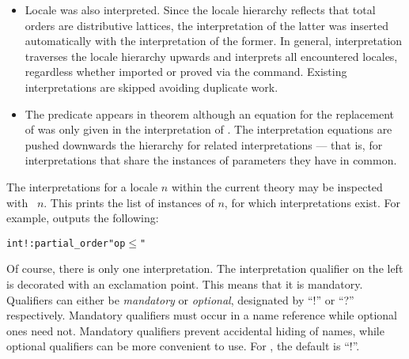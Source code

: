 \begin{isabellebody}
\begin{isamarkuptext}
\begin{itemize}
\item
  Locale  was also interpreted.  Since the
  locale hierarchy reflects that total orders are distributive
  lattices, the interpretation of the latter was inserted
  automatically with the interpretation of the former.  In general,
  interpretation traverses the locale hierarchy upwards and interprets
  all encountered locales, regardless whether imported or proved via
  the  command.  Existing interpretations are
  skipped avoiding duplicate work.
\item
  The predicate  appears in theorem 
  although an equation for the replacement of  was only
  given in the interpretation of .  The
  interpretation equations are pushed downwards the hierarchy for
  related interpretations --- that is, for interpretations that share
  the instances of parameters they have in common.
\end{itemize}%
\end{isamarkuptext}%
\isamarkuptrue%
%
\begin{isamarkuptext}%
The interpretations for a locale $n$ within the current
  theory may be inspected with ~$n$.  This
  prints the list of instances of $n$, for which interpretations exist.
  For example,  
  outputs the following:
\begin{small}
\begin{alltt}
  int! : partial_order "op \(\le\)"
\end{alltt}
\end{small}
  Of course, there is only one interpretation.
  The interpretation qualifier on the left is decorated with an
  exclamation point.  This means that it is mandatory.  Qualifiers
  can either be \emph{mandatory} or \emph{optional}, designated by
  ``!'' or ``?'' respectively.  Mandatory qualifiers must occur in a
  name reference while optional ones need not.  Mandatory qualifiers
  prevent accidental hiding of names, while optional qualifiers can be
  more convenient to use.  For , the
  default is ``!''.%
\end{isamarkuptext}%

\end{isabellebody}

